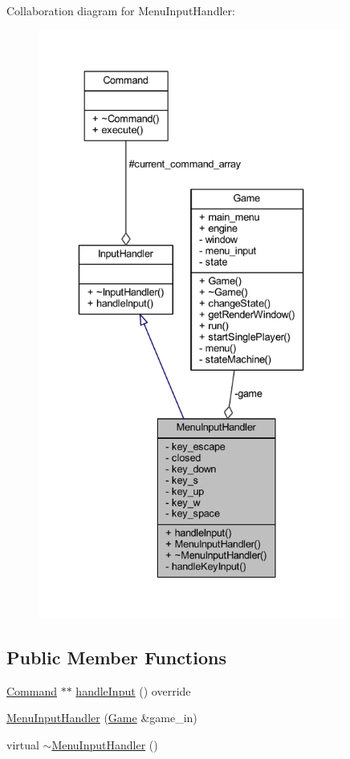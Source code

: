 Collaboration diagram for Menu\+Input\+Handler\+:\nopagebreak
\begin{figure}[H]
\begin{center}
\leavevmode
\includegraphics[height=550pt]{class_menu_input_handler__coll__graph}
\end{center}
\end{figure}
\subsection*{Public Member Functions}
\begin{DoxyCompactItemize}
\item 
\hyperlink{class_command}{Command} $\ast$$\ast$ \hyperlink{class_menu_input_handler_a60840342f557c79f31097aa713ba7a37}{handle\+Input} () override
\item 
\hyperlink{class_menu_input_handler_ae0a666273bb8b76cea8352e600b987fc}{Menu\+Input\+Handler} (\hyperlink{class_game}{Game} \&game\+\_\+in)
\item 
virtual \hyperlink{class_menu_input_handler_a283ab0103c42ef398b7d632dd99d1bee}{$\sim$\+Menu\+Input\+Handler} ()
\end{DoxyCompactItemize}
